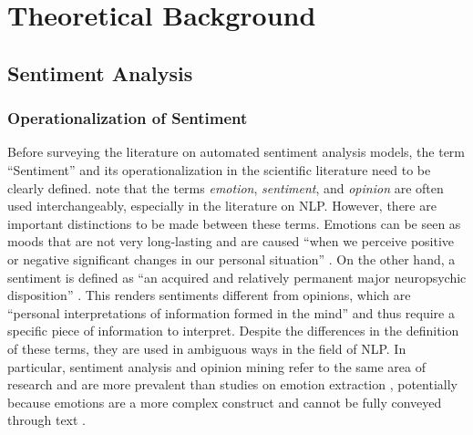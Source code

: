 \section{Theoretical Background}



\subsection{Sentiment Analysis}  %
\subsubsection{Operationalization of Sentiment}
Before surveying the literature on automated sentiment analysis models, the term ``Sentiment'' and its operationalization in the scientific literature need to be clearly defined.  note that the terms \emph{emotion}, \emph{sentiment}, and \emph{opinion} are often used interchangeably, especially in the literature on NLP. However, there are important distinctions to be made between these terms. Emotions can be seen as moods that are not very long-lasting and are caused ``when we perceive positive or negative significant changes in our personal situation'' . On the other hand, a sentiment is defined as ``an acquired and relatively permanent major neuropsychic disposition'' \cite[p.~16]{cattell1940sentiment}. This renders sentiments different from opinions, which are ``personal interpretations of information formed in the mind'' \cite[p.~4]{munezero2014they} and thus require a specific piece of information to interpret. %
Despite the differences in the definition of these terms, they are used in ambiguous ways in the field of NLP. In particular, sentiment analysis and opinion mining refer to the same area of research \cite{liu2012book} and are more prevalent than studies on emotion extraction , potentially because emotions are a more complex construct and cannot be fully conveyed through text .

